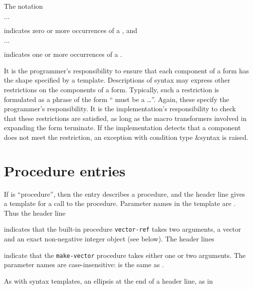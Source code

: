 The notation
\begin{tabbing}
\qquad {} $\ldots$
\end{tabbing}
indicates zero or more occurrences of a , and
\begin{tabbing}
\qquad {}  $\ldots$
\end{tabbing}
indicates one or more occurrences of a .

It is the programmer's responsibility to ensure that each component of
a form has the shape specified by a template.  Descriptions of syntax
may express other restrictions on the components of a form.
Typically, such a restriction is formulated as a phrase of the form
`` must be a \ldots''.  Again, these
specify the programmer's responsibility.  It is the implementation's
responsibility to check that these restrictions are satisfied, as long
as the macro transformers involved in expanding the form terminate.
If the implementation detects that a component does not meet the
restriction, an exception with condition type {\cf\&syntax} is raised.

\section{Procedure entries}

If  is ``procedure'', then the entry describes a procedure, and
the header line gives a template for a call to the procedure.  Parameter
names in the template are .  Thus the header line

\noindent{}\unpenalty

indicates that the built-in procedure {\tt vector-ref} takes
two arguments, a vector  and an exact non-negative integer
object  (see below).  The header lines

\noindent%
\unpenalty

indicate that the {\tt make-vector} procedure takes
either one or two arguments.  The parameter names are
case-insensitive:  is the same as .

As with syntax templates, an ellipsis \dotsfoo{} at the end of a header
line, as in

\noindent{}\unpenalty

